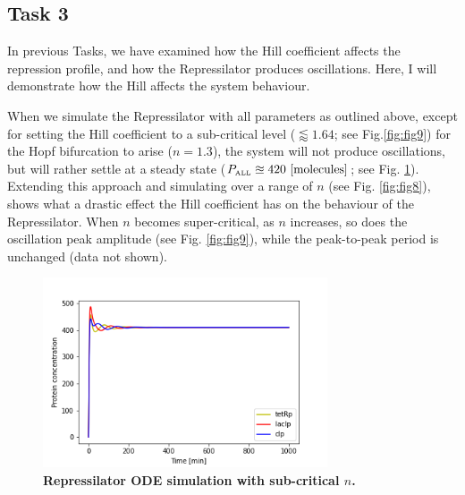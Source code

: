 \documentclass[runningheads,a4paper]{llncs}
\begin{document}
\clearpage
\subsection*{Task 3}
In previous Tasks, we have examined how the Hill coefficient affects the repression profile, and how the Repressilator produces oscillations. Here, I will demonstrate how the Hill affects the system behaviour. 

When we simulate the Repressilator with all parameters as outlined above, except for setting the Hill coefficient to a sub-critical level ($\lessapprox 1.64$; see Fig.\ref{fig:fig9}) for the Hopf bifurcation to arise ($n = 1.3$), the system will not produce oscillations, but will rather settle at a steady state ($P_{\textrm{\tiny ALL}} \approxeq 420\ [\textrm{molecules}]$; see Fig. \ref{fig:fig7}). Extending this approach and simulating over a range of $n$ (see Fig. \ref{fig:fig8}), shows what a drastic effect the Hill coefficient has on the behaviour of the Repressilator. When $n$ becomes super-critical, as $n$ increases, so does the oscillation peak amplitude (see Fig. \ref{fig:fig9}), while the peak-to-peak period is unchanged (data not shown).

\vspace{-3\abovedisplayskip}
\begin{figure}
    \singlespacing
    \centering
    \includegraphics[width=0.75\textwidth]{suplementary_information_and_code/Task3_figure1.png}
    \caption{\textbf{Repressilator ODE simulation with sub-critical $n$.}}
    \label{fig:fig7}
\end{figure}
\end{document}
